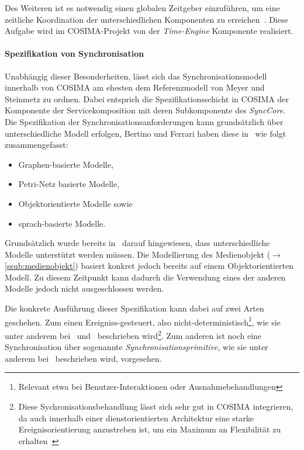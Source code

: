   Des Weiteren ist es notwendig einen globalen Zeitgeber einzuführen, um eine zeitliche Koordination der unterschiedlichen Komponenten zu erreichen~\citep[S. 610]{multimedia_technologie}. Diese Aufgabe wird im COSIMA-Projekt von der \emph{Time-Engine} Komponente realisiert.


\paragraph{Spezifikation von Synchronisation} %
\label{par:spezifikation_von_synchronisation}

  Unabhängig dieser Besonderheiten, lässt sich das Synchronisationsmodell innerhalb von COSIMA am ehesten dem Referenzmodell von Meyer und Steinmetz zu ordnen. Dabei entsprich die Spezifikationsschicht in COSIMA der Komponente der Servicekomposition mit deren Subkomponente des \emph{SyncCore}. Die Spezifikation der Synchronisationsanforderungen kann grundsätzlich über unterschiedliche Modell erfolgen, Bertino und Ferrari haben diese in~\citep[S. 617]{bertino1998tsm} wie folgt zusammengefasst:
  
  \begin{itemize}
    \item Graphen-basierte Modelle, 
    \item Petri-Netz basierte Modelle, 
    \item Objektorientierte Modelle sowie 
    \item sprach-basierte Modelle.
  \end{itemize}
  
  Grundsätzlich wurde bereits in~\citep[S. 34]{bericht} darauf hingewiesen, dass unterschiedliche Modelle unterstützt werden müssen. Die Modellierung des Medienobjekt ($\to$ \ref{ssub:medienobjekt}) basiert konkret jedoch bereits auf einem Objektorientierten Modell. Zu diesem Zeitpunkt kann dadurch die Verwendung eines der anderen Modelle jedoch nicht ausgeschlossen werden.

  Die konkrete Ausführung dieser Spezifikation kann dabei auf zwei Arten geschehen. Zum einen Ereigniss-gesteuert, also nicht-deterministisch\footnote{Relevant etwa bei Benutzer-Interaktionen oder Ausnahmebehandlungen}, wie sie unter anderem bei~\citep{little1991ms} und~\citep{bertino1998tsm} beschrieben wird\footnote{Diese Sychronisationsbehandlung lässt sich sehr gut in COSIMA integrieren, da auch innerhalb einer dienstorientierten Architektur eine starke Ereignisorientierung anzustreben ist, um ein Maximum an Flexibilität zu erhalten~\citep[S. 96]{masak2007ssb}}. Zum anderen ist noch eine Synchronisation über sogenannte \emph{Synchronisationsprimitive}, wie sie unter anderem bei~\citep{gaggi2005msh} beschrieben wird, vorgesehen.
  
